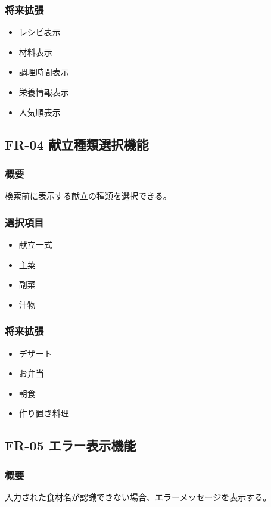 \documentclass[a4paper,12pt]{jarticle}
\begin{document}
\subsubsection*{将来拡張}
\begin{itemize}
    \item レシピ表示
    \item 材料表示
    \item 調理時間表示
    \item 栄養情報表示
    \item 人気順表示
\end{itemize}

\subsection{FR-04 献立種類選択機能}

\subsubsection*{概要}
検索前に表示する献立の種類を選択できる。

\subsubsection*{選択項目}
\begin{itemize}
    \item 献立一式
    \item 主菜
    \item 副菜
    \item 汁物
\end{itemize}

\subsubsection*{将来拡張}
\begin{itemize}
    \item デザート
    \item お弁当
    \item 朝食
    \item 作り置き料理
\end{itemize}

\subsection{FR-05 エラー表示機能}

\subsubsection*{概要}
入力された食材名が認識できない場合、エラーメッセージを表示する。
\end{document}
